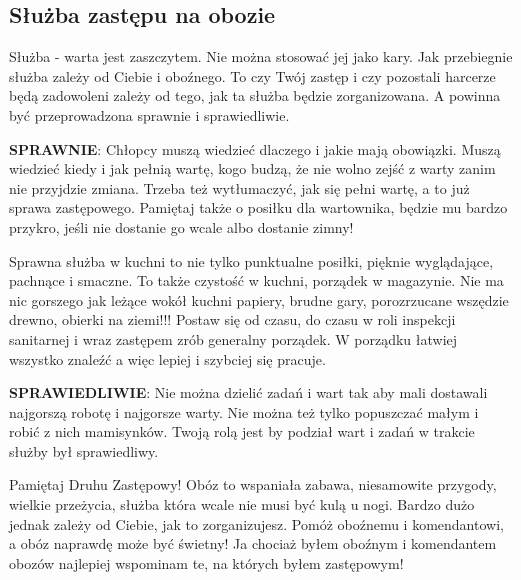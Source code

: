 \subsection{Służba zastępu na obozie}
	Służba - warta  jest  zaszczytem. Nie można stosować jej jako kary. Jak  przebiegnie  służba  zależy  od  Ciebie  i oboźnego. To czy Twój  zastęp i czy pozostali harcerze będą  zadowoleni zależy  od tego, jak  ta służba będzie zorganizowana. A powinna być przeprowadzona  sprawnie i sprawiedliwie.
	
\textbf{SPRAWNIE}: Chłopcy muszą wiedzieć dlaczego i jakie mają obowiązki. Muszą  wiedzieć kiedy i jak pełnią wartę, kogo budzą, że nie wolno zejść  z  warty zanim nie przyjdzie zmiana. Trzeba też wytłumaczyć, jak się pełni wartę, a to już sprawa zastępowego. Pamiętaj  także o posiłku dla  wartownika, będzie mu bardzo przykro, jeśli nie  dostanie go  wcale albo dostanie zimny!

Sprawna służba w  kuchni to nie tylko punktualne posiłki, pięknie wyglądające,  pachnące  i  smaczne. To także czystość  w  kuchni, porządek w magazynie. Nie ma nic gorszego jak leżące wokół kuchni papiery, brudne gary, porozrzucane wszędzie drewno, obierki na ziemi!!! Postaw się od czasu, do czasu w roli inspekcji sanitarnej i wraz zastępem zrób generalny porządek. W  porządku  łatwiej  wszystko  znaleźć a więc  lepiej  i szybciej się  pracuje.

\textbf{SPRAWIEDLIWIE}: Nie  można dzielić zadań i wart tak aby mali dostawali najgorszą  robotę i najgorsze warty. Nie można też tylko popuszczać małym i robić z nich mamisynków. Twoją rolą jest by podział wart i zadań w trakcie służby był sprawiedliwy.

	Pamiętaj Druhu Zastępowy! Obóz to  wspaniała zabawa,  niesamowite przygody, wielkie przeżycia, służba która wcale nie musi być kulą u nogi. Bardzo dużo jednak zależy od Ciebie, jak to zorganizujesz. Pomóż oboźnemu i komendantowi, a obóz naprawdę może być świetny!
	Ja chociaż byłem oboźnym i komendantem obozów najlepiej wspominam te, na których byłem zastępowym!

